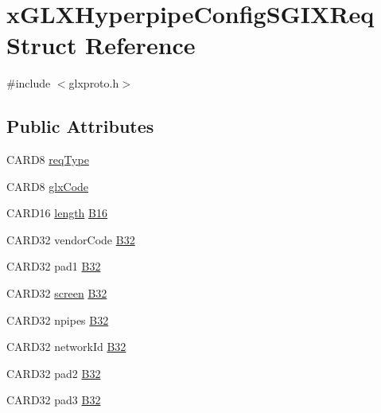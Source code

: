 \hypertarget{structx_g_l_x_hyperpipe_config_s_g_i_x_req}{}\section{x\+G\+L\+X\+Hyperpipe\+Config\+S\+G\+I\+X\+Req Struct Reference}
\label{structx_g_l_x_hyperpipe_config_s_g_i_x_req}


{\ttfamily \#include $<$glxproto.\+h$>$}

\subsection*{Public Attributes}
\begin{DoxyCompactItemize}
\item 
C\+A\+R\+D8 \hyperlink{structx_g_l_x_hyperpipe_config_s_g_i_x_req_a058aa63504d62112f89345d98fcfd75c}{req\+Type}
\item 
C\+A\+R\+D8 \hyperlink{structx_g_l_x_hyperpipe_config_s_g_i_x_req_a413070c5ee9310ea31d860b79a0427ec}{glx\+Code}
\item 
C\+A\+R\+D16 \hyperlink{glcorearb_8h_ab9c919755bde3b34349e23a32b4e0fa7}{length} \hyperlink{structx_g_l_x_hyperpipe_config_s_g_i_x_req_ad666b67de8b9de5ecb5ee00a586653aa}{B16}
\item 
C\+A\+R\+D32 vendor\+Code \hyperlink{structx_g_l_x_hyperpipe_config_s_g_i_x_req_a003fa5d3d6ce6bee58c43191d2c6a2e9}{B32}
\item 
C\+A\+R\+D32 pad1 \hyperlink{structx_g_l_x_hyperpipe_config_s_g_i_x_req_a055a4ab01b979d0cba045a0764b63e8b}{B32}
\item 
C\+A\+R\+D32 \hyperlink{cad_8h_ae04e09e4e3831bfc1632c509ae37dcec}{screen} \hyperlink{structx_g_l_x_hyperpipe_config_s_g_i_x_req_ae2cda0c44fe87b3b7fc47f9e6207506c}{B32}
\item 
C\+A\+R\+D32 npipes \hyperlink{structx_g_l_x_hyperpipe_config_s_g_i_x_req_a0b7402d3f6c9cbcb5bb9394d796ee8cf}{B32}
\item 
C\+A\+R\+D32 network\+Id \hyperlink{structx_g_l_x_hyperpipe_config_s_g_i_x_req_a8f24a0ac5cd5fc93f67169d0d2118390}{B32}
\item 
C\+A\+R\+D32 pad2 \hyperlink{structx_g_l_x_hyperpipe_config_s_g_i_x_req_ae9dfbb136d6df5018a43a231e8fc74c6}{B32}
\item 
C\+A\+R\+D32 pad3 \hyperlink{structx_g_l_x_hyperpipe_config_s_g_i_x_req_a614b42583950bdc0b69c3ccdfc8816cf}{B32}
\end{DoxyCompactItemize}


